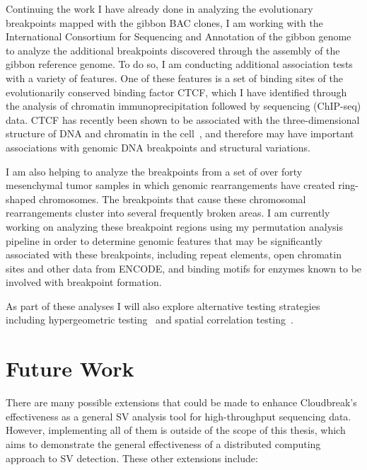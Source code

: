 \documentclass [11pt] {report}
\begin{document}
Continuing the work I have already done in analyzing the evolutionary breakpoints mapped with the gibbon BAC clones, I am working with the International Consortium for Sequencing and Annotation of the gibbon genome to analyze the additional breakpoints discovered through the assembly of the gibbon reference genome. To do so, I am conducting additional association tests with a variety of features. One of these features is a set of binding sites of the evolutionarily conserved binding factor CTCF, which I have identified through the analysis of chromatin immunoprecipitation followed by sequencing (ChIP-seq) data. CTCF has recently been shown to be associated with the three-dimensional structure of DNA and chromatin in the cell~\cite{Dixon:2012gc}, and therefore may have important associations with genomic DNA breakpoints and structural variations.

I am also helping to analyze the breakpoints from a set of over forty mesenchymal tumor samples in which genomic rearrangements have created ring-shaped chromosomes. The breakpoints that cause these chromosomal rearrangements cluster into several frequently broken areas. I am currently working on analyzing these breakpoint regions using my permutation analysis pipeline in order to determine genomic features that may be significantly associated with these breakpoints, including repeat elements, open chromatin sites and other data from ENCODE, and binding motifs for enzymes known to be involved with breakpoint formation.

As part of these analyses I will also explore alternative testing strategies including hypergeometric testing~\cite{Sandve:2013ip} and spatial correlation testing~\cite{Favorov:2012dy}.

\chapter{Future Work}

There are many possible extensions that could be made to enhance Cloudbreak's effectiveness as a general SV analysis tool for high-throughput sequencing data. However, implementing all of them is outside of the scope of this thesis, which aims to demonstrate the general effectiveness of a distributed computing approach to SV detection. These other extensions include:
\end{document}
